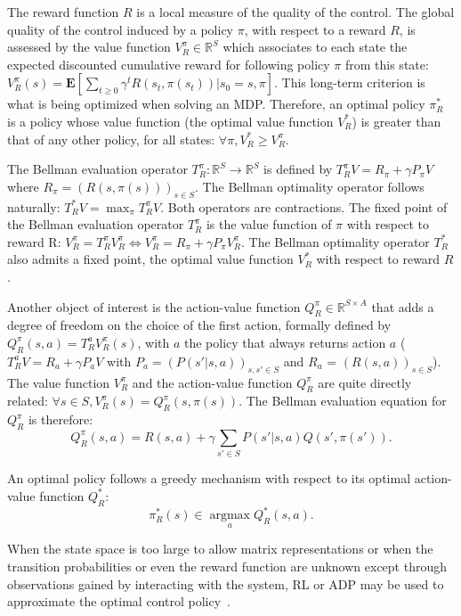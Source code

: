 \documentclass{llncs}
\newcommand{\E}{\mathbf{E}}
\newcommand{\argmax}{\operatorname*{argmax}} %
\begin{document}
The reward function $R$ is a local measure of the quality of the control. The global quality of the control induced by a policy $\pi$, with respect to a reward $R$, is assessed by the value function $V^\pi_R \in \mathbb{R}^{S}$ which associates to each state the expected discounted cumulative reward for following policy $\pi$ from this state:
$V^\pi_R(s) = \E[\sum_{t\geq 0}\gamma^tR(s_t,\pi(s_t))|s_0 = s,\pi]$.
This long-term criterion is what is being optimized when solving an MDP. Therefore, an optimal policy $\pi^*_R$ is a policy whose value function (the optimal value function $V^*_R$) is greater than that of any other policy, for all states: $\forall \pi, V^*_R\geq V^\pi_R$.

The Bellman evaluation operator $T^\pi_R: \mathbb{R}^{S} \rightarrow  \mathbb{R}^{S}$ is defined by
$  T^{\pi}_RV = R_\pi + \gamma P_\pi V$
where $R_\pi = (R(s,\pi(s)))_{s\in S}$. The Bellman optimality operator follows naturally:
 $ T^*_RV = \max_\pi T^\pi_RV$.
  Both operators are contractions. The fixed point of the Bellman evaluation operator $T^\pi_R$ is the value function of $\pi$ with respect to reward R:
    $V^\pi_R = T^\pi_R V^\pi_R \Leftrightarrow V^\pi_R = R_\pi + \gamma P_\pi V^\pi_R$.
The Bellman optimality operator $T^*_R$ also admits a fixed point, the optimal value function $V_R^*$ with respect to reward $R$.

Another object of interest is the action-value function $Q^\pi_R\in\mathbb{R}^{S\times A}$ that adds a degree of freedom on the choice of the first action, formally defined by $Q^\pi_R(s,a) = T^a_RV^\pi_R(s)$, with $a$ the policy that always returns action $a$ ($T^a_RV = R_a + \gamma P_a V$ with $P_a = (P(s'|s,a))_{s,s' \in S}$ and $R_a$ = $(R(s,a))_{s\in S}$). The value function $V^\pi_R$ and the action-value function $Q^\pi_R$ are quite directly related: $\forall s \in S, V^\pi_R(s) = Q^\pi_R(s,\pi(s))$. The Bellman evaluation equation for $Q^\pi_R$ is therefore:
\begin{equation}
  Q^\pi_R(s,a) = R(s,a) + \gamma \sum_{s'\in S}P(s'|s,a) Q(s',\pi(s')).
  \label{eq:bellman1}
\end{equation}

An optimal policy follows a greedy mechanism with respect to its optimal action-value function $Q^*_R$:
\begin{equation}
  \label{eq:greedy}
  \pi^*_R(s)\in\argmax_aQ^*_R(s,a).
\end{equation}

When the state space is too large to allow matrix representations or when the transition probabilities or even the reward function are unknown except through observations gained by interacting with the system, RL or ADP may be used to approximate the optimal control policy~\cite{sutton1998reinforcement}.
\end{document}
